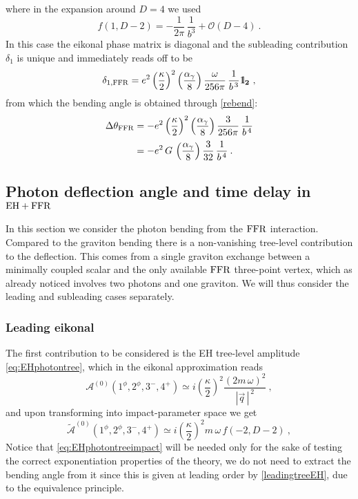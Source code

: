\documentclass[a4paper,11pt]{article}
\numberwithin{equation}{section}
\newcommand{\cA}{\mathcal{A}}
\newcommand{\cO}{\mathcal{O}}
\def\cA{\mathcal{A}}
\def\uno{\mbox{1 \kern-.59em {\rm l}}}
\begin{document}
where in the expansion around $D=4$ we used
\begin{equation}
    f(1,D-2)=-\frac{1}{2 \pi} \, \frac{1}{b^3} +\cO(D-4)\ .
\end{equation}
In this case the eikonal phase matrix is diagonal and the subleading contribution $\delta_1$ is unique and immediately reads off to be
\begin{equation}
    \delta_{1,{\rm FFR}} = e^2 \left( \frac{\kappa}{2}\right)^2 \left( \frac{\alpha_\gamma}{8} \right) \frac{\omega}{256 \pi}\, \frac{1}{b^{\, 3}} \bf{\uno}_2\ ,
\end{equation}
from which the bending angle is obtained through \eqref{rebend}:
\begin{equation}
    \begin{split}
        \Delta \theta_{\rm FFR} &= - e^2 \left( \frac{\kappa}{2}\right)^2 \left( \frac{\alpha_\gamma}{8} \right) \frac{3}{256 \pi}\, \frac{1}{b^{\, 4}}\\[.2em]
        &= - e^2 \, G \, \left( \frac{\alpha_\gamma}{8} \right) \frac{3}{32}\, \frac{1}{b^{\, 4}} \> .
    \end{split}
\end{equation}

\subsection{Photon deflection angle and time delay in \texorpdfstring{${\rm EH} + {\rm FFR}$}{EH + FFR}}

In this section we consider the photon bending from the $\rm FFR$ interaction. Compared to the graviton bending there is a non-vanishing tree-level contribution to the deflection. This comes from a single graviton exchange between a minimally coupled scalar and the only available $\rm FFR$ three-point vertex, which as already noticed involves two photons and one graviton. We will thus consider the leading and subleading cases separately.

\subsubsection{Leading eikonal}

The first contribution to be considered is the EH tree-level amplitude \eqref{eq:EHphotontree}, which in the eikonal approximation reads
\begin{equation}
    \cA^{(0)} (1^\phi, 2^\phi, 3^{-}, 4^{+}) \simeq i \left(\frac{\kappa}{2}\right)^2 \frac{(2m\,\omega)^2}{\left|\vec{q}\,\right|^{\, 2}} \> ,
\end{equation}
and upon transforming into impact-parameter space we get
\begin{equation}\label{eq:EHphotontreeimpact}
    \widetilde{\cA}^{(0)} (1^\phi, 2^\phi, 3^{-}, 4^{+}) \simeq i \left(\frac{\kappa}{2}\right)^2 m\,\omega\, f(-2,D-2) \> ,
\end{equation}
Notice that \eqref{eq:EHphotontreeimpact} will be needed only for the sake of testing the correct exponentiation properties of the theory, we do not need to extract the bending angle from it since this is given at leading order by \eqref{leadingtreeEH}, due to the equivalence principle.
\end{document}
